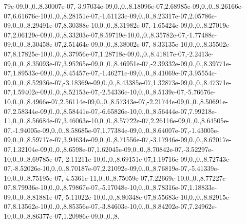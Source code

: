 {79e-\/09,0.,0.,8.\-30007e-\/07,-\/3.\-97034e-\/09,0.,0.,8.\-18096e-\/07,2.\-68985e-\/09,0.,0.,8.\-26166e-\/07,6.\-61676e-\/10,0.,0.,8.\-28151e-\/07,-\/1.\-61123e-\/09,0.,0.,8.\-23317e-\/07,2.\-05786e-\/09,0.,0.,8.\-29491e-\/07,8.\-30388e-\/10,0.,0.,8.\-31982e-\/07,-\/1.\-65424e-\/09,0.,0.,8.\-27019e-\/07,2.\-06129e-\/09,0.,0.,8.\-33203e-\/07,8.\-59719e-\/10,0.,0.,8.\-35782e-\/07,-\/1.\-77488e-\/09,0.,0.,8.\-30458e-\/07,2.\-51464e-\/09,0.,0.,8.\-38002e-\/07,-\/8.\-33135e-\/10,0.,0.,8.\-35502e-\/07,8.\-17825e-\/10,0.,0.,8.\-37956e-\/07,1.\-28718e-\/09,0.,0.,8.\-41817e-\/07,-\/2.\-2413e-\/09,0.,0.,8.\-35093e-\/07,3.\-95265e-\/09,0.,0.,8.\-46951e-\/07,-\/2.\-39332e-\/09,0.,0.,8.\-39771e-\/07,1.\-89533e-\/09,0.,0.,8.\-45457e-\/07,-\/1.\-46271e-\/09,0.,0.,8.\-41069e-\/07,3.\-95554e-\/09,0.,0.,8.\-52936e-\/07,-\/3.\-18369e-\/09,0.,0.,8.\-43385e-\/07,1.\-32873e-\/09,0.,0.,8.\-47371e-\/07,1.\-59402e-\/09,0.,0.,8.\-52153e-\/07,-\/2.\-54336e-\/10,0.,0.,8.\-5139e-\/07,-\/5.\-76676e-\/10,0.,0.,8.\-4966e-\/07,2.\-56114e-\/09,0.,0.,8.\-57343e-\/07,-\/2.\-21744e-\/09,0.,0.,8.\-50691e-\/07,2.\-58344e-\/09,0.,0.,8.\-58441e-\/07,-\/6.\-65826e-\/10,0.,0.,8.\-56444e-\/07,7.\-99218e-\/11,0.,0.,8.\-56684e-\/07,3.\-46063e-\/10,0.,0.,8.\-57722e-\/07,2.\-26116e-\/09,0.,0.,8.\-64505e-\/07,-\/1.\-94005e-\/09,0.,0.,8.\-58685e-\/07,1.\-77384e-\/09,0.,0.,8.\-64007e-\/07,-\/1.\-43005e-\/09,0.,0.,8.\-59717e-\/07,3.\-94634e-\/09,0.,0.,8.\-71556e-\/07,-\/3.\-17946e-\/09,0.,0.,8.\-62017e-\/07,1.\-32104e-\/09,0.,0.,8.\-6598e-\/07,1.\-62045e-\/09,0.,0.,8.\-70842e-\/07,-\/3.\-52297e-\/10,0.,0.,8.\-69785e-\/07,-\/2.\-11211e-\/10,0.,0.,8.\-69151e-\/07,1.\-19716e-\/09,0.,0.,8.\-72743e-\/07,-\/8.\-52026e-\/10,0.,0.,8.\-70187e-\/07,2.\-21092e-\/09,0.,0.,8.\-76819e-\/07,-\/5.\-41339e-\/10,0.,0.,8.\-75195e-\/07,-\/4.\-5361e-\/11,0.,0.,8.\-75059e-\/07,7.\-22669e-\/10,0.,0.,8.\-77227e-\/07,8.\-79936e-\/10,0.,0.,8.\-79867e-\/07,-\/5.\-17048e-\/10,0.,0.,8.\-78316e-\/07,1.\-18833e-\/09,0.,0.,8.\-81881e-\/07,-\/5.\-11022e-\/10,0.,0.,8.\-80348e-\/07,8.\-55683e-\/10,0.,0.,8.\-82915e-\/07,8.\-13562e-\/10,0.,0.,8.\-85356e-\/07,-\/3.\-84603e-\/10,0.,0.,8.\-84202e-\/07,7.\-24962e-\/10,0.,0.,8.\-86377e-\/07,1.\-20986e-\/09,0.,0.,8.}
